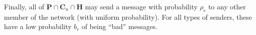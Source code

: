 \documentclass{article}
\newcommand{\Hub}[0]{\ensuremath{\mathbf{H}}}
\newcommand{\C}[1]{\ensuremath{\mathbf{C}_{#1}}}
\begin{document}
Finally, all of $\mathbf{P}\cap\C{n}\cap\Hub$ may send a message with probability $\rho_r$ to any other member of the network (with uniform probability).  For all types of senders, these have a low probability $b_r$ of being ``bad'' messages.

\newpage


\end{document}
